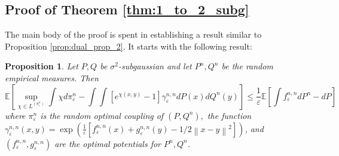 \documentclass{article}
\newtheorem{proposition}{Proposition}
\theoremstyle{definition}
\newcommand{\feps}{f_\varepsilon}
\newcommand{\geps}{g_\varepsilon}
\newcommand{\norm}[1]{\left\lVert#1\right\rVert}
\begin{document}
\subsection{Proof of Theorem \ref{thm:1_to_2_subg}} 
The main body of the proof is spent in establishing a result similar to Proposition \ref{prop:dual_prop_2}. It starts with the following result:
\begin{proposition}
     Let $P,Q$ be $\sigma^2$-subgaussian and let $P^n, Q^n$ be the random empirical measures. Then
     \begin{equation*}
         \mathbb{E}\left [ \sup_{\chi \in L^(\pi^n_\varepsilon)} \int \chi d\pi_\varepsilon^n - \int \int \left [ e^{\chi(x,y)} - 1\right ] \gamma_\varepsilon^{n,n} dP(x)dQ^n(y) \right ] \leq \frac{1}{\varepsilon}\mathbb{E} \left [ \int \feps^{n,n} dP^n - dP\right ]
     \end{equation*}
     where $\pi_\varepsilon^n$ is the random optimal coupling of $(P,Q^n),$ the function $\gamma^{n,n}_\varepsilon(x,y) = \exp(\frac{1}{\varepsilon}[\feps^{n,n}(x) + \geps^{n,n}(y) - 1/2\norm{x-y}^2])$, and $(\feps^{n,n}, \geps^{n,n})$ are the optimal potentials for $P^n,Q^n$.
\end{proposition} 
\end{document}
